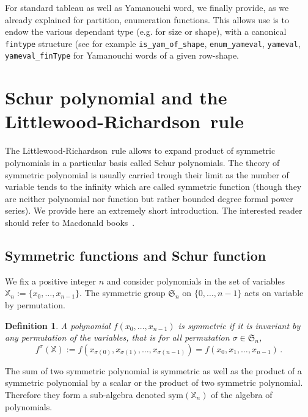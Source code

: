 \documentclass[12pt,a4paper]{article}
\let\verb=\lstinline
\newcommand{\LR}{Littlewood-Richardson\ }
\newcommand{\SG}{{\mathfrak S}}
\newcommand{\sym}{\mathrm{sym}}
\newcommand{\alphX}{{\mathbb X}}
\newtheorem{DEFN}{Definition}
\begin{document}
For standard tableau as well as Yamanouchi word, we finally provide, as we
already explained for partition, enumeration functions. This allows use is to
endow the various dependant type (e.g. for size or shape), with a canonical
\verb{fintype} structure (see for example \verb{is_yam_of_shape},
\verb{enum_yameval}, \verb{yameval}, \verb{yameval_finType} for
Yamanouchi words of a given row-shape.
\section{Schur polynomial and the \LR rule}

The \LR rule allows to expand product of symmetric polynomials in a particular
basis called Schur polynomials. The theory of symmetric polynomial is usually
carried trough their limit as the number of variable tends to the infinity
which are called symmetric function (though they are neither polynomial nor
function but rather bounded degree formal power series). We provide here an
extremely short introduction. The interested reader should refer to Macdonald
books~\cite{Macddo}.

\subsection{Symmetric functions and Schur function}

We fix a positive integer $n$ and consider polynomials in the set of variables
$\alphX_n:=\{x_0,\dots,x_{n-1}\}$. The symmetric group $\SG_n$ on
$\{0,\dots,n-1\}$ acts on variable by permutation.
\begin{DEFN}
 A polynomial $f(x_0,\dots,x_{n-1})$ is symmetric if it is invariant by any
 permutation of the variables, that is for all permutation $\sigma\in\SG_n$,
 \begin{equation}
   f^\sigma(\alphX) := f(x_{\sigma(0)}, x_{\sigma(1)}, \dots, x_{\sigma(n-1)}) = 
   f(x_{0}, x_{1}, \dots, x_{n-1})\,.
 \end{equation}
\end{DEFN}
The sum of two symmetric polynomial is symmetric as well as the product of a
symmetric polynomial by a scalar or the product of two symmetric
polynomial. Therefore they form a sub-algebra denoted $\sym(\alphX_n)$ of the
algebra of polynomials.
\end{document}
